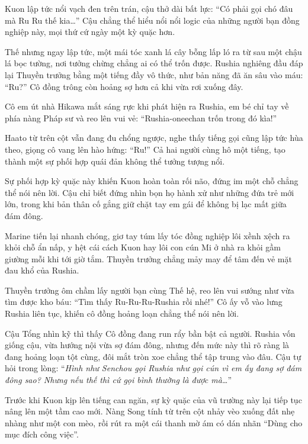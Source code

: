 \documentclass[../main.tex]{subfiles}
\begin{document}
Kuon lập tức nổi vạch đen trên trán, cậu thở dài bất lực: ``Có phải gọi chó đâu mà Ru Ru thế kia\dots'' Cậu chẳng thể hiểu nổi nổi logic của những người bạn đồng nghiệp này, mọi thứ cứ ngày một kỳ quặc hơn.

Thế nhưng ngay lập tức, một mái tóc xanh lá cây bỗng lấp ló ra từ sau một chậu lá bọc tường, nơi tưởng chừng chẳng ai có thể trốn được. Rushia nghiêng đầu đáp lại Thuyền trưởng bằng một tiếng đầy vô thức, như bản năng đã ăn sâu vào máu: ``Ru?'' Cô đồng trông còn hoảng sợ hơn cả khi vừa rơi xuống đây.


Cô em út nhà Hikawa mắt sáng rực khi phát hiện ra Rushia, em bé chỉ tay về phía nàng Pháp sư và reo lên vui vẻ: ``Rushia-oneechan trốn trong đó kìa!''

Haato từ trên cột vẫn đang đu chổng ngược, nghe thấy tiếng gọi cũng lập tức hùa theo, giọng cô vang lên hào hứng: ``Ru!'' Cả hai người cùng hô một tiếng, tạo thành một sự phối hợp quái đản không thể tưởng tượng nổi.

Sự phối hợp kỳ quặc này khiến Kuon hoàn toàn rối não, đứng im một chỗ chẳng thể nói nên lời. Cậu chỉ biết đứng nhìn bọn họ hành xử như những đứa trẻ mới lớn, trong khi bản thân cố gắng giữ chặt tay em gái để không bị lạc mất giữa đám đông.

Marine tiến lại nhanh chóng, giơ tay túm lấy tóc đồng nghiệp lôi xềnh xệch ra khỏi chỗ ẩn nấp, y hệt cái cách Kuon hay lôi con cún Mi ở nhà ra khỏi gầm giường mỗi khi tới giờ tắm. Thuyền trưởng chẳng mảy may để tâm đến vẻ mặt đau khổ của Rushia.

Thuyền trưởng ôm chầm lấy người bạn cùng Thế hệ, reo lên vui sướng như vừa tìm được kho báu: ``Tìm thấy Ru-Ru-Ru-Rushia rồi nhé!'' Cô ấy vỗ vào lưng Rushia liên tục, khiến cô đồng hoảng loạn chẳng thể nói nên lời.

Cậu Tổng nhìn kỹ thì thấy Cô đồng đang run rẩy bần bật cả người. Rushia vốn giống cậu, vừa hướng nội vừa sợ đám đông, nhưng đến mức này thì rõ ràng là đang hoảng loạn tột cùng, đôi mắt tròn xoe chẳng thể tập trung vào đâu. Cậu tự hỏi trong lòng: ``\textit{Hình như Senchou gọi Rushia như gọi cún vì em ấy đang sợ đám đông sao? Nhưng nếu thế thì cứ gọi bình thường là được mà\dots}''


Trước khi Kuon kịp lên tiếng can ngăn, sự kỳ quặc của vũ trường này lại tiếp tục nâng lên một tầm cao mới. Nàng Song tính từ trên cột nhảy vèo xuống đất nhẹ nhàng như một con mèo, rồi rút ra một cái thanh mờ ám có dán nhãn ``Dùng cho mục đích công việc''.
\end{document}
